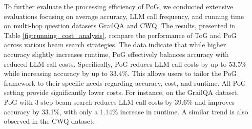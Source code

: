\newpage
{}
To further evaluate the processing efficiency of PoG, we conducted extensive evaluations focusing on average accuracy, LLM call frequency, and running time on multi-hop question datasets GrailQA and CWQ. The results, presented in Table \ref{fig:running_cost_analysis}, compare the performance of ToG and PoG across various beam search strategies. The data indicate that while higher accuracy slightly increases runtime, PoG effectively balances accuracy with reduced LLM call costs. Specifically, PoG reduces LLM call costs by up to 53.5\% while increasing accuracy by up to 33.4\%. This allows users to tailor the PoG framework to their specific needs regarding accuracy, cost, and runtime. All PoG setting provide significantly lower costs. For instance, on the GrailQA dataset, PoG with 3-step beam search reduces LLM call costs by 39.6\% and improves accuracy by 33.1\%, with only a 1.14\% increase in runtime. A similar trend is also observed in the CWQ dataset.




